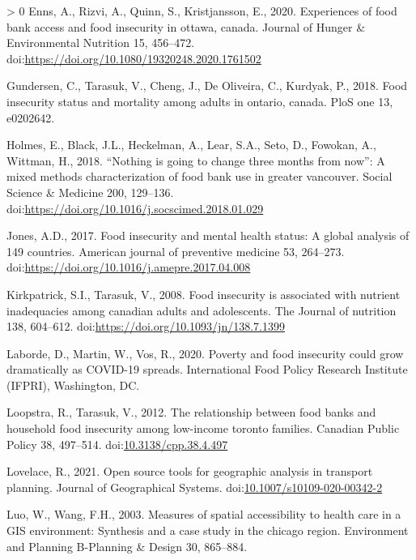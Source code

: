 \documentclass[]{elsarticle} %
\newlength{\cslhangindent}
\newenvironment{CSLReferences}[3] %
 {%
  \setlength{\parindent}{0pt}
  \ifodd #1 \everypar{\setlength{\hangindent}{\cslhangindent}}\ignorespaces\fi
  \ifnum #2 > 0
  \setlength{\parskip}{#2\baselineskip}
  \fi
 }%
 {}
\begin{document}
\begin{CSLReferences}{1}{0}
\leavevmode\hypertarget{ref-enns2020experiences}{}%
Enns, A., Rizvi, A., Quinn, S., Kristjansson, E., 2020. Experiences of
food bank access and food insecurity in ottawa, canada. Journal of
Hunger \& Environmental Nutrition 15, 456--472.
doi:\url{https://doi.org/10.1080/19320248.2020.1761502}

\leavevmode\hypertarget{ref-gundersen2018food}{}%
Gundersen, C., Tarasuk, V., Cheng, J., De Oliveira, C., Kurdyak, P.,
2018. Food insecurity status and mortality among adults in ontario,
canada. PloS one 13, e0202642.

\leavevmode\hypertarget{ref-holmes2018nothing}{}%
Holmes, E., Black, J.L., Heckelman, A., Lear, S.A., Seto, D., Fowokan,
A., Wittman, H., 2018. {``Nothing is going to change three months from
now''}: A mixed methods characterization of food bank use in greater
vancouver. Social Science \& Medicine 200, 129--136.
doi:\url{https://doi.org/10.1016/j.socscimed.2018.01.029}

\leavevmode\hypertarget{ref-jones2017food}{}%
Jones, A.D., 2017. Food insecurity and mental health status: A global
analysis of 149 countries. American journal of preventive medicine 53,
264--273. doi:\url{https://doi.org/10.1016/j.amepre.2017.04.008}

\leavevmode\hypertarget{ref-kirkpatrick2008food}{}%
Kirkpatrick, S.I., Tarasuk, V., 2008. Food insecurity is associated with
nutrient inadequacies among canadian adults and adolescents. The Journal
of nutrition 138, 604--612.
doi:\url{https://doi.org/10.1093/jn/138.7.1399}

\leavevmode\hypertarget{ref-laborde2020poverty}{}%
Laborde, D., Martin, W., Vos, R., 2020. Poverty and food insecurity
could grow dramatically as COVID-19 spreads. International Food Policy
Research Institute (IFPRI), Washington, DC.

\leavevmode\hypertarget{ref-loopstra2012relationship}{}%
Loopstra, R., Tarasuk, V., 2012. The relationship between food banks and
household food insecurity among low-income toronto families. Canadian
Public Policy 38, 497--514.
doi:\href{https://doi.org/10.3138/cpp.38.4.497}{10.3138/cpp.38.4.497}

\leavevmode\hypertarget{ref-lovelace2021open}{}%
Lovelace, R., 2021. Open source tools for geographic analysis in
transport planning. Journal of Geographical Systems.
doi:\href{https://doi.org/10.1007/s10109-020-00342-2}{10.1007/s10109-020-00342-2}

\leavevmode\hypertarget{ref-luo2003measures}{}%
Luo, W., Wang, F.H., 2003. Measures of spatial accessibility to health
care in a GIS environment: Synthesis and a case study in the chicago
region. Environment and Planning B-Planning \& Design 30, 865--884.


\end{CSLReferences}
\end{document}
